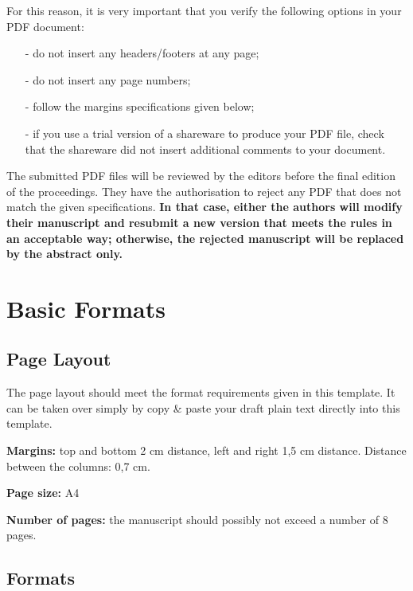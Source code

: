 \documentclass[a4paper, 10pt, twocolumn]{article}
\begin{document}
For this reason, it is very important that you verify the following options in your PDF document:
\begin{itemize}
	\item[-] do not insert any headers/footers at any page;
	\item[-] do not insert any page numbers;
	\item[-] follow the margins specifications given below;
	\item[-] if you use a trial version of a shareware to produce your PDF file, check that the shareware did not insert additional comments to your document.
\end{itemize}

The submitted PDF files will be reviewed by the editors before the final edition of the proceedings. They have the authorisation to reject any PDF that does not match the given specifications. \textbf{In that case, either the authors will modify their manuscript and resubmit a new version that meets the rules in an acceptable way; otherwise, the rejected manuscript will be replaced by the abstract only.}



\section{Basic Formats} \label{sec:BasicFormats}

\subsection{Page Layout}
The page layout should meet the format requirements given in this template. It can be taken over simply by copy \& paste your draft plain text directly into this template.

\textbf{Margins:} top and bottom 2 cm distance, left and right 1,5 cm distance. Distance between the columns: 0,7 cm.

\textbf{Page size:} A4

\textbf{Number of pages:} the manuscript should possibly not exceed a number of 8 pages.

\subsection{Formats} \label{sec:Formats}
\end{document}
